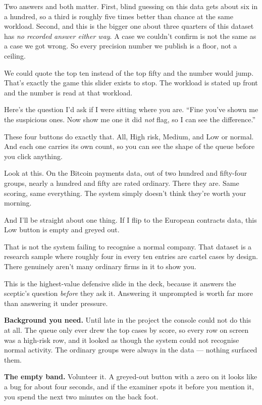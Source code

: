\documentclass[11pt]{article}
\begin{document}
\begin{asked}
 Two answers and both matter. First, blind guessing on
this data gets about six in a hundred, so a third is roughly five times better
than chance at the same workload. Second, and this is the bigger one \bt about
three quarters of this dataset has \emph{no recorded answer either way}. A case
we couldn't confirm is not the same as a case we got wrong. So every precision
number we publish is a floor, not a ceiling.

 We could quote the top ten instead of the
top fifty and the number would jump. That's exactly the game this slider exists
to stop. The workload is stated up front and the number is read at that
workload.
\end{asked}


\begin{saythis}
Here's the question I'd ask if I were sitting where you are. ``Fine \bt you've
shown me the suspicious ones. Now show me one it did \emph{not} flag, so I can
see the difference.''

These four buttons do exactly that. All, High risk, Medium, and Low or normal.
And each one carries its own count, so you can see the shape of the queue
before you click anything.

Look at this. On the Bitcoin payments data, out of two hundred and fifty-four
groups, nearly a hundred and fifty are rated ordinary.  There
they are. Same scoring, same everything. The system simply doesn't think
they're worth your morning.

And I'll be straight about one thing.  If I flip to
the European contracts data, this Low button is empty and greyed out.

That is not the system failing to recognise a normal company. That dataset is a
research sample where roughly four in every ten entries are cartel cases by
design. There genuinely aren't many ordinary firms in it to show you.
\end{saythis}

\begin{means}
This is the highest-value defensive slide in the deck, because it answers the
sceptic's question \emph{before} they ask it. Answering it unprompted is worth
far more than answering it under pressure.

\textbf{Background you need.} Until late in the project the console could not
do this at all. The queue only ever drew the top cases by score, so every row
on screen was a high-risk row, and it looked as though the system could not
recognise normal activity. The ordinary groups were always in the data ---
nothing surfaced them.

\textbf{The empty band.} Volunteer it. A greyed-out button with a zero on it
looks like a bug for about four seconds, and if the examiner spots it before
you mention it, you spend the next two minutes on the back foot.
\end{means}
\end{document}
